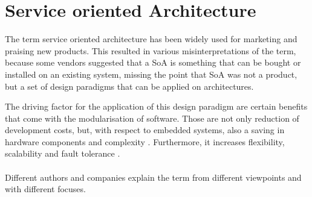 \section{Service oriented Architecture}
\label{ch:soa}

The term service oriented architecture has been widely used for marketing and praising new products. This resulted in various misinterpretations of the term, because some vendors suggested that a SoA is something that can be bought or installed on an existing system, missing the point that SoA was not a product, but a set of design paradigms that can be applied on architectures.

The driving factor for the application of this design paradigm are certain benefits that come with the modularisation of software. Those are not only reduction of development costs, but, with respect to embedded systems, also a saving in hardware components and complexity \cite{sommer}. Furthermore, it increases flexibility, scalability and fault tolerance \cite[p.33]{rosen} \cite[p.17-18]{josuttis}.
\\
\\
Different authors and companies explain the term from different viewpoints and with different focuses.

